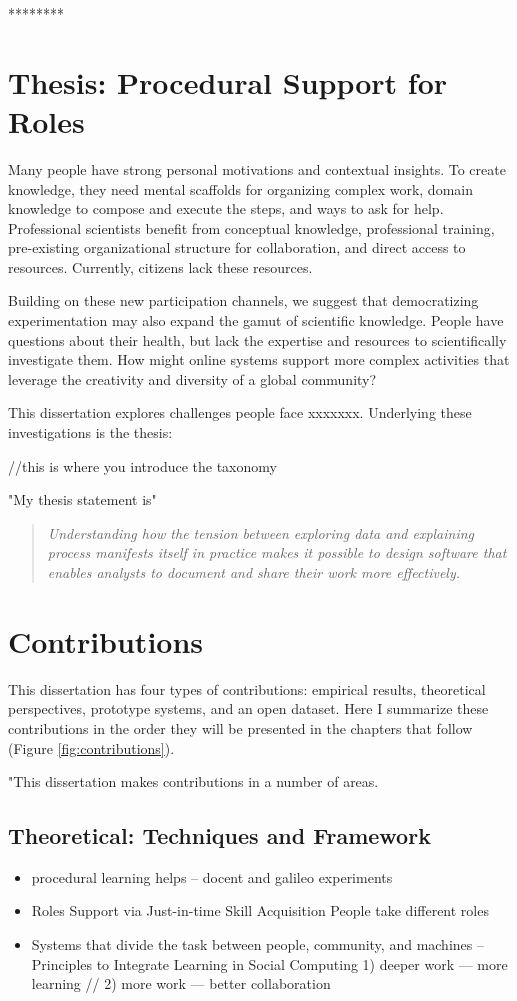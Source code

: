 ********
\section{Thesis: Procedural Support for Roles}

Many people have strong personal motivations and contextual insights. To create knowledge,
they need mental scaffolds for organizing complex work, domain knowledge to compose and
execute the steps, and ways to ask for help. Professional scientists benefit from conceptual
knowledge, professional training, pre-existing organizational structure for collaboration, and direct access to resources. Currently, citizens lack these resources.

Building on these new participation channels, we suggest that democratizing experimentation may
also expand the gamut of scientific knowledge. People have questions about their health, but lack
the expertise and resources to scientifically investigate them. How might online systems support
more complex activities that leverage the creativity and diversity of a global community?

This dissertation explores challenges people face xxxxxxx. Underlying these investigations is the thesis:

//this is where you introduce the taxonomy 

"My thesis statement is"
\begin{quote}
\emph{Understanding how the tension between exploring data and explaining process manifests itself in practice makes it possible to design software that enables analysts to document and share their work more effectively.}
\end{quote}




\section{Contributions}
This dissertation has four types of contributions: empirical results, theoretical perspectives, prototype systems, and an open dataset. Here I summarize these contributions in the order they will be presented in the chapters that follow (Figure \ref{fig:contributions}).

"This dissertation makes contributions in a number of areas.

\subsection{Theoretical: Techniques and Framework}
\begin{itemize}
\item procedural learning helps -- docent and galileo experiments
\item Roles Support via Just-in-time Skill Acquisition
 People take different roles
\item  Systems that divide the task between people, community, and machines
-- Principles to Integrate Learning in Social Computing
	1) deeper work — more learning   //     2) more work — better collaboration

\end{itemize}


